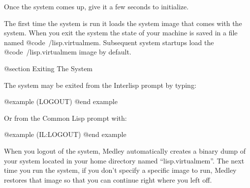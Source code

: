 Once the system comes up, give it a few seconds to initialize.

The first time the system is run it loads the system image that comes
with the system.  When you exit the system the state of your machine is saved
in a file named @code{~/lisp.virtualmem}.  Subsequent system startups 
load the @code{~/lisp.virtualmem} image by default.

@section Exiting The System

The system may be exited from the Interlisp prompt by typing:

@example
(LOGOUT)
@end example

Or from the Common Lisp prompt with:

@example
(IL:LOGOUT)
@end example

When you logout of the system, Medley automatically creates a binary
dump of your system located in your home directory named
``lisp.virtualmem''. The next time you run the system, if you don't
specify a specific image to run, Medley restores that image so that
you can continue right where you left off.


